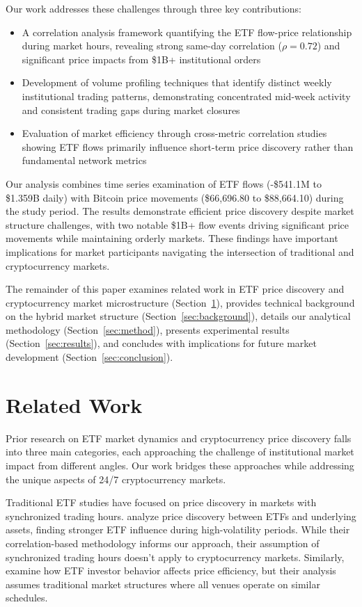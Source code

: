 \documentclass{article} %
\begin{document}
Our work addresses these challenges through three key contributions:
\begin{itemize}
    \item A correlation analysis framework quantifying the ETF flow-price relationship during market hours, revealing strong same-day correlation ($\rho = 0.72$) and significant price impacts from \$1B+ institutional orders
    \item Development of volume profiling techniques that identify distinct weekly institutional trading patterns, demonstrating concentrated mid-week activity and consistent trading gaps during market closures
    \item Evaluation of market efficiency through cross-metric correlation studies showing ETF flows primarily influence short-term price discovery rather than fundamental network metrics
\end{itemize}

Our analysis combines time series examination of ETF flows (-\$541.1M to \$1.359B daily) with Bitcoin price movements (\$66,696.80 to \$88,664.10) during the study period. The results demonstrate efficient price discovery despite market structure challenges, with two notable \$1B+ flow events driving significant price movements while maintaining orderly markets. These findings have important implications for market participants navigating the intersection of traditional and cryptocurrency markets.

The remainder of this paper examines related work in ETF price discovery and cryptocurrency market microstructure (Section~\ref{sec:related}), provides technical background on the hybrid market structure (Section~\ref{sec:background}), details our analytical methodology (Section~\ref{sec:method}), presents experimental results (Section~\ref{sec:results}), and concludes with implications for future market development (Section~\ref{sec:conclusion}).

\section{Related Work}
\label{sec:related}

Prior research on ETF market dynamics and cryptocurrency price discovery falls into three main categories, each approaching the challenge of institutional market impact from different angles. Our work bridges these approaches while addressing the unique aspects of 24/7 cryptocurrency markets.

Traditional ETF studies have focused on price discovery in markets with synchronized trading hours. \citet{Oztekin2017PriceDA} analyze price discovery between ETFs and underlying assets, finding stronger ETF influence during high-volatility periods. While their correlation-based methodology informs our approach, their assumption of synchronized trading hours doesn't apply to cryptocurrency markets. Similarly, \citet{Kosar2022InattentivePD} examine how ETF investor behavior affects price efficiency, but their analysis assumes traditional market structures where all venues operate on similar schedules.
\end{document}
